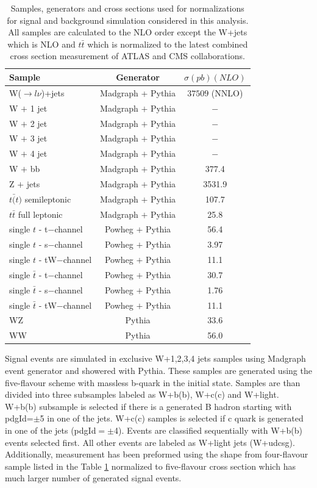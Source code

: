 \begin{table}[h]
  \centering
  \caption{Samples, generators and cross sections used for normalizations for signal and background simulation considered in this analysis. All samples are calculated to the NLO order except the W+jets which is NLO and $t\bar{t}$ which is normalized to the latest combined cross section measurement of ATLAS and CMS collaborations\cite{CMS:2014gta}. }
  \label{tab:samples}
  \begin{tabular}{ l  c c}
      \hline
      \hline
      	Sample & Generator & $\sigma(pb)(NLO)$ \\
      	\hline
    		W($\rightarrow l \nu$)+jets &  Madgraph + Pythia & $37509$ (NNLO) \\
     	W $+$ 1 jet & Madgraph $+$ Pythia & $-$ \\
     	W $+$ 2 jet & Madgraph $+$ Pythia & $-$ \\
     	W $+$ 3 jet & Madgraph $+$ Pythia & $-$ \\
     	W $+$ 4 jet & Madgraph $+$ Pythia & $-$ \\
     	W $+$ bb & Madgraph $+$ Pythia & 377.4 \\
     	\hline
     	Z $+$ jets & Madgraph $+$ Pythia &  3531.9 \\     	
     	$t\bar(t)$ semileptonic & Madgraph $+$ Pythia &  107.7 \\
     	$t\bar{t}$ full leptonic & Madgraph $+$ Pythia &  25.8 \\
     	\hline
     	single $t$ - t$-$channel & Powheg $+$ Pythia &  56.4 \\
     	single $t$ - s$-$channel & Powheg $+$ Pythia &  3.97 \\
		single $t$ - tW$-$channel & Powheg $+$ Pythia &  11.1 \\
		single $\bar{t}$ - t$-$channel & Powheg $+$ Pythia &  30.7 \\
		single $\bar{t}$ - s$-$channel & Powheg $+$ Pythia &  1.76 \\
		single $\bar{t}$ - tW$-$channel & Powheg $+$ Pythia &  11.1 \\
		\hline
		WZ & Pythia & 33.6 \\
		WW & Pythia & 56.0 \\
      \hline
      \hline 
  \end{tabular}
\end{table}

Signal events are simulated in exclusive W+1,2,3,4 jets samples using Madgraph event generator and showered with Pythia. These samples are generated using the five-flavour scheme with massless b-quark in the initial state. Samples are than divided into three subsamples labeled as W+b(b), W+c(c) and W+light. W+b(b) subsample is selected if there is a generated B hadron starting with pdgId=$\pm$5 in one of the jets. W+c(c) samples is selected if c quark is generated in one of the jets (pdgId$=\pm$4). Events are classified sequentially with W+b(b) events selected first. All other events are labeled as W+light jets (W+udcsg). Additionally, measurement has been preformed using the shape from four-flavour sample listed in the Table \ref{tab:samples} normalized to five-flavour cross section which has much larger number of generated signal events.

